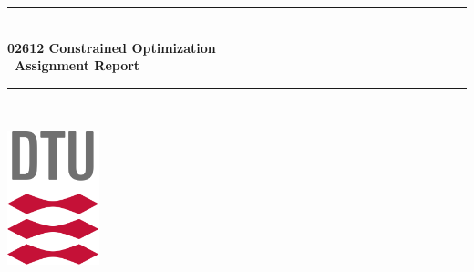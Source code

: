 

\begin{titlepage}

\newcommand{\HRule}{\rule{\linewidth}{0.5mm}} %

\center %
 





\HRule \\[0.8cm]
{\Large \bfseries02612 Constrained Optimization}\\[0.4cm]
{\huge \bfseries \ Assignment Report}
\HRule \\[0.5cm]
\vspace{1.5cm}



\includegraphics[width=0.2\textwidth]{figures/DTUlogo.png}\\[1.8cm] %
 

\end{titlepage}
